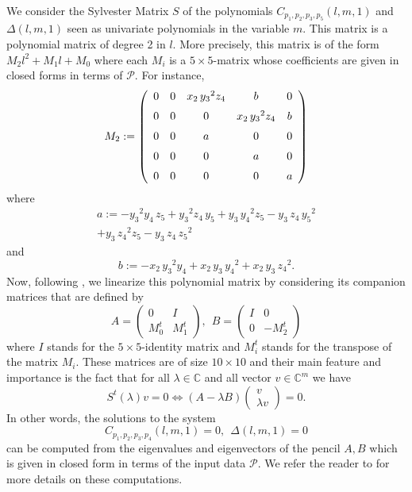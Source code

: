 \documentclass[5p]{elsarticle}
\newcommand\Pc{\mathcal P}
\newcommand{\com}[1]{{\color{black} #1}}
\begin{document}
We consider the Sylvester Matrix $S$ of the polynomials $C_{p_1,p_2,p_3,p_5}(l,m,1)$ and $\Delta(l,m,1)$ seen as univariate polynomials in the variable $m$. This matrix is a polynomial matrix of degree 2 in $l$. More precisely, \com{this matrix} is of the form $M_2l^2+M_1l+M_0$ where each $M_i$ is a $5\times 5$-matrix whose coefficients are given in closed forms in terms of $\Pc$. For instance, 
$$
M_2:=\left( 
\begin {array}{ccccc} 0&0&{  x_2}\,{{  y_3}}^{2}{  
z_4}& b &0
\\ \noalign{\medskip}0&0&0&{  x_2}\,{{  y_3}}^{2}{  z_4}&b 
\\ \noalign{\medskip}0&0& a &0&0
\\ \noalign{\medskip}0&0&0&a&0
\\ \noalign{\medskip}0&0&0&0&a
\end {array} \right) 
$$
where 
\begin{multline*}
a:=-{{  y_3}}^{2}{  y_4}\,{  z_5}+{{
  y_3}}^{2}{  z_4}\,{  y_5}+{  y_3}\,{{  y_4}}^{2}{  
z_5}-{  y_3}\,{  z_4}\,{{  y_5}}^{2} \\ +{  y_3}\,{{  z_4}
}^{2}{  z_5} -{  y_3}\,{  z_4}\,{{  z_5}}^{2}
\end{multline*}
and
$$b:=-{  x_2}\,{{  y_3}}^{2}{  y_4}+{  x_2}\,{  y_3}\,
{{  y_4}}^{2}+{  x_2}\,{  y_3}\,{{  z_4}}^{2}.$$	
Now, following \cite{BKM05}, we linearize this polynomial matrix by considering its companion matrices that are defined by 
$$
 A= \left( \begin{array}{cc}
0 & I  \\ M_0^t & M_1^t \end{array}\right), \ \ 
B= \left( \begin{array}{cc}
I & 0 \\ 0 & -M_{2}^t  \end{array}\right)
$$
where $I$ stands for the $5\times 5$-identity matrix and $M^t_i$ stands for the transpose of the matrix $M_i$. These matrices are of size $10\times 10$ and their main feature and importance is the fact that for all $\lambda \in \mathbb{C}$ and all vector $v\in \mathbb{C}^m$ we have
$$S^t(\lambda)v=0\Leftrightarrow (A-\lambda B) \left( \begin{array}{c} v\\\lambda v \end{array}
\right)=0.$$ 
In other words, the solutions to the system 
$$C_{p_1,p_2,p_3,p_4}(l,m,1)=0, \ \ \Delta(l,m,1)=0$$ 
can be computed from the eigenvalues and eigenvectors of the pencil $A,B$ which is given in closed form in terms of the input data $\Pc$. We refer the reader to \cite{BKM05} for more details on these computations. 
 
\end{document}
